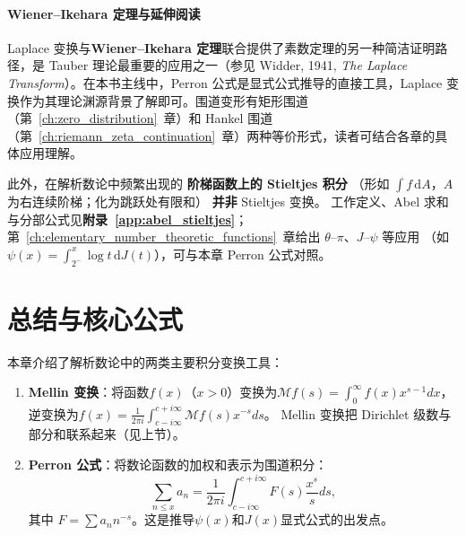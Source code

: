 \paragraph{Wiener--Ikehara 定理与延伸阅读}
Laplace 变换与\textbf{Wiener--Ikehara 定理}联合提供了素数定理的另一种简洁证明路径，是 Tauber 理论最重要的应用之一（参见 Widder, 1941, \textit{The Laplace Transform}）。在本书主线中，Perron 公式是显式公式推导的直接工具，Laplace 变换作为其理论渊源背景了解即可。围道变形有矩形围道（第~\ref{ch:zero_distribution}~章）和 Hankel 围道（第~\ref{ch:riemann_zeta_continuation}~章）两种等价形式，读者可结合各章的具体应用理解。

此外，在解析数论中频繁出现的 \textbf{阶梯函数上的 Stieltjes 积分}
（形如 $\int f\,\mathrm{d}A$，$A$ 为右连续阶梯；化为跳跃处有限和）
\textbf{并非} Stieltjes 变换。
工作定义、Abel 求和与分部公式见\textbf{附录~\ref{app:abel_stieltjes}}；
第~\ref{ch:elementary_number_theoretic_functions}~章给出 $\theta$–$\pi$、$J$–$\psi$ 等应用
（如 $\psi(x)=\int_{2^-}^x\log t\,\mathrm{d}J(t)$），可与本章 Perron 公式对照。


\section{总结与核心公式}

本章介绍了解析数论中的两类主要积分变换工具：

\begin{enumerate}
    \item \textbf{Mellin 变换}：将函数$f(x)$（$x>0$）变换为$\mathcal{M}f(s) = \int_0^{\infty} f(x)x^{s-1}dx$，
          逆变换为$f(x) = \frac{1}{2\pi i}\int_{c-i\infty}^{c+i\infty} \mathcal{M}f(s) x^{-s} ds$。
          Mellin 变换把 Dirichlet 级数与部分和联系起来（见上节）。
    
    \item \textbf{Perron 公式}：将数论函数的加权和表示为围道积分：
          \[
          \sum_{n\le x} a_n = \frac{1}{2\pi i} \int_{c-i\infty}^{c+i\infty} F(s) \frac{x^s}{s} ds,
          \]
          其中 $F=\sum a_n n^{-s}$。这是推导$\psi(x)$和$J(x)$显式公式的出发点。
\end{enumerate}

